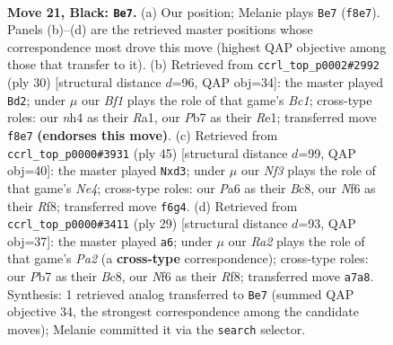 \documentclass[11pt]{article}
\begin{document}
\clearpage

\begin{figure}[p]\centering
\begin{subfigure}{0.46\textwidth}\centering
\resizebox{\linewidth}{!}{%
\newchessgame
\chessboard[
  setfen={1nr2bk1/rp1b1p2/p1q1pn2/B5pN/7N/3BP3/PP3PPP/R2QR1K1 b - - 0 21},
  showmover=false,
  pgfstyle=straightmove, color=movearrow, markmove={f8-e7}
]}
\caption{}
\end{subfigure}\hfill
\begin{subfigure}{0.46\textwidth}\centering
\resizebox{\linewidth}{!}{%
\newchessgame
\chessboard[
  setfen={r2q1rk1/pp3pp1/3bb2p/3n4/3PQ3/P1N2N2/1P3PPP/R1B1R1K1 w - - 1 16},
  showmover=false,
  pgfstyle=straightmove, color=movearrow, markmove={c1-d2}
]}
\caption{}
\end{subfigure}
\\[4pt]
\begin{subfigure}{0.46\textwidth}\centering
\resizebox{\linewidth}{!}{%
\newchessgame
\chessboard[
  setfen={1rb2rk1/4bp1p/p3p1pB/P2nn3/Nq6/3B4/2PNQPPP/R1R3K1 b - - 1 23},
  showmover=false,
  pgfstyle=straightmove, color=movearrow, markmove={e5-d3}
]}
\caption{}
\end{subfigure}\hfill
\begin{subfigure}{0.46\textwidth}\centering
\resizebox{\linewidth}{!}{%
\newchessgame
\chessboard[
  setfen={r1b2rk1/pp1nbppp/4p3/1BqpP3/3N1B2/8/P1P2PPP/1R1QR1K1 b - - 1 15},
  showmover=false,
  pgfstyle=straightmove, color=movearrow, markmove={a7-a6}
]}
\caption{}
\end{subfigure}
\caption{\textbf{Move 21, Black: \texttt{Be7}.} (a) Our position; Melanie plays \texttt{Be7} (\texttt{f8e7}). Panels (b)--(d) are the retrieved master positions whose correspondence most drove this move (highest QAP objective among those that transfer to it). (b) Retrieved from \texttt{ccrl\_top\_p0002\#2992} (ply 30) [structural distance $d$=96, QAP obj=34]: the master played \texttt{Bd2}; under $\mu$ our \emph{Bf1} plays the role of that game's \emph{Bc1}; cross-type roles: our \emph{n}h4 as their \emph{R}a1, our \emph{P}b7 as their \emph{R}e1; transferred move \texttt{f8e7} \textbf{(endorses this move)}. (c) Retrieved from \texttt{ccrl\_top\_p0000\#3931} (ply 45) [structural distance $d$=99, QAP obj=40]: the master played \texttt{Nxd3}; under $\mu$ our \emph{Nf3} plays the role of that game's \emph{Ne4}; cross-type roles: our \emph{P}a6 as their \emph{B}c8, our \emph{N}f6 as their \emph{R}f8; transferred move \texttt{f6g4}. (d) Retrieved from \texttt{ccrl\_top\_p0000\#3411} (ply 29) [structural distance $d$=93, QAP obj=37]: the master played \texttt{a6}; under $\mu$ our \emph{Ra2} plays the role of that game's \emph{Pa2} (a \textbf{cross-type} correspondence); cross-type roles: our \emph{P}b7 as their \emph{B}c8, our \emph{N}f6 as their \emph{R}f8; transferred move \texttt{a7a8}. Synthesis: 1 retrieved analog transferred to \texttt{Be7} (summed QAP objective 34, the strongest correspondence among the candidate moves); Melanie committed it via the \texttt{search} selector.}
\label{fig:thought-m41}
\end{figure}
\end{document}

